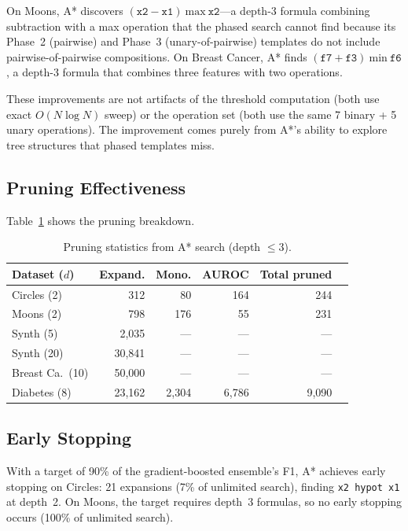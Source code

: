 \documentclass[journal]{IEEEtran}
\begin{document}
On Moons, A* discovers $(\texttt{x2} - \texttt{x1})~\mathrm{max}~\texttt{x2}$---a
depth-3 formula combining subtraction with a max operation that the
phased search cannot find because its Phase~2 (pairwise) and Phase~3
(unary-of-pairwise) templates do not include pairwise-of-pairwise
compositions. On Breast Cancer, A* finds
$(\texttt{f7} + \texttt{f3})~\mathrm{min}~\texttt{f6}$, a depth-3
formula that combines three features with two operations.

These improvements are not artifacts of the threshold computation
(both use exact $O(N\log N)$ sweep) or the operation set (both use
the same 7 binary + 5 unary operations). The improvement comes
purely from A*'s ability to explore tree structures that phased
templates miss.

\subsection{Pruning Effectiveness}

Table~\ref{tab:pruning_stats} shows the pruning breakdown.

\begin{table}[h]
\caption{Pruning statistics from A* search (depth $\leq 3$).}
\label{tab:pruning_stats}
\scriptsize
\begin{tabular}{@{}lrrrrr@{}}
\toprule
Dataset ($d$) & Expand. & Mono. & AUROC & Total pruned \\
\midrule
Circles (2) & 312 & 80 & 164 & 244 \\
Moons (2) & 798 & 176 & 55 & 231 \\
Synth (5) & 2{,}035 & --- & --- & --- \\
Synth (20) & 30{,}841 & --- & --- & --- \\
Breast Ca.\ (10) & 50{,}000 & --- & --- & --- \\
Diabetes (8) & 23{,}162 & 2{,}304 & 6{,}786 & 9{,}090 \\
\bottomrule
\end{tabular}
\end{table}

\subsection{Early Stopping}

With a target of 90\% of the gradient-boosted ensemble's F1, A*
achieves early stopping on Circles: 21 expansions (7\% of unlimited
search), finding \texttt{x2 hypot x1} at depth~2. On Moons, the
target requires depth~3 formulas, so no early stopping occurs
(100\% of unlimited search).
\end{document}
